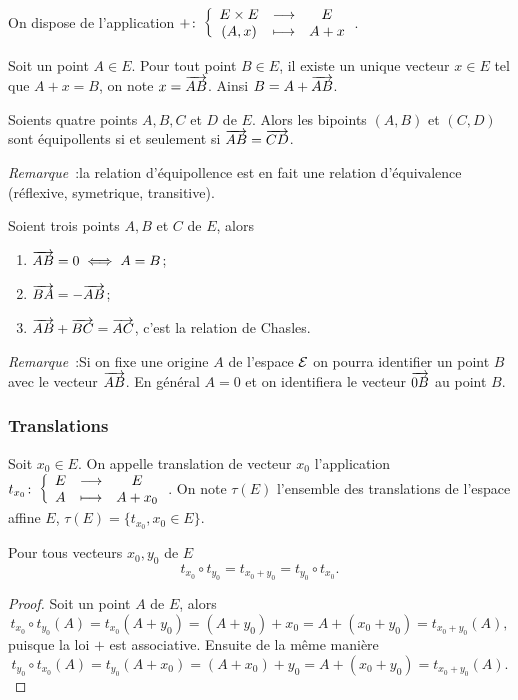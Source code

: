 On dispose de l'application \(+\colon \left\{\begin{array}{ccc} E\times E & \longrightarrow &E\\ (A,x) & \longmapsto & A+x \end{array} \right.\).

\begin{defdef}
  Soit un point \(A \in E\). Pour tout point \(B \in E\), il existe un unique vecteur \(x \in E\) tel que \(A+x=B\), on note \(x=\overrightarrow{AB}\). Ainsi \(B=A+\overrightarrow{AB}\).
\end{defdef}
\begin{defdef}
  Soients quatre points \(A,B,C\) et \(D\) de \(E\). Alors les bipoints \((A,B)\) et \((C,D)\) sont équipollents si et seulement si \(\overrightarrow{AB}=\overrightarrow{CD}\).
\end{defdef}

\emph{Remarque}~:la relation d'équipollence est en fait une relation d'équivalence (réflexive, symetrique, transitive).

\begin{prop}
  Soient trois points \(A,B\) et \(C\) de \(E\), alors
  \begin{enumerate}
  \item \(\overrightarrow{AB}=0 \iff A=B\);
  \item \(\overrightarrow{BA}=-\overrightarrow{AB}\);
  \item \(\overrightarrow{AB}+\overrightarrow{BC}=\overrightarrow{AC}\), c'est la relation de Chasles.
  \end{enumerate}
\end{prop}

\emph{Remarque}~:Si on fixe une origine \(A\) de l'espace \(\mathcal{E}\) on pourra identifier un point \(B\) avec le vecteur \(\overrightarrow{AB}\). En général \(A=0\) et on identifiera le vecteur \(\overrightarrow{0B}\) au point \(B\).

\subsubsection{Translations}

\begin{defdef}
  Soit \(x_0 \in E\). On appelle translation de vecteur \(x_0\) l'application \(t_{x_0}\colon \left\{\begin{array}{ccc} E & \longrightarrow &E\\ A & \longmapsto & A+x_0 \end{array} \right.\). On note \(\tau(E)\) l'ensemble des translations de l'espace affine \(E\), \(\tau(E)=\{t_{x_0}, x_0 \in E\}\).
\end{defdef}

\begin{prop}\label{prop:associativitevec}
  Pour tous vecteurs \(x_0, y_0\) de \(E\)
  \begin{equation}
    t_{x_0} \circ t_{y_0} = t_{x_0 +y_0} = t_{y_0} \circ t_{x_0}.
  \end{equation}
\end{prop}
\begin{proof}
  Soit un point \(A\) de \(E\), alors
  \begin{equation}
    t_{x_0} \circ t_{y_0} (A)=t_{x_0}(A+y_0) = (A+y_0)+x_0 = A+(x_0+y_0) =t_{x_0+y_0}(A),
  \end{equation}
  puisque la loi \(+\) est associative. Ensuite de la même manière
  \begin{equation}
    t_{y_0} \circ t_{x_0} (A)=t_{y_0}(A+x_0) = (A+x_0)+y_0 = A+(x_0+y_0)=t_{x_0+y_0}(A).
  \end{equation}
\end{proof}

